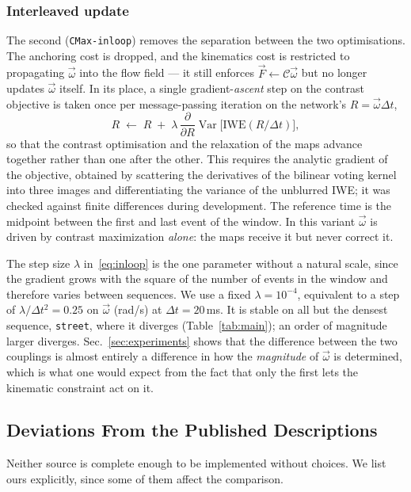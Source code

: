 \documentclass[journal]{IEEEtran}
\newcommand{\Fmap}{\vec{F}}
\newcommand{\Cmat}{\mathcal{C}}
\newcommand{\wvec}{\vec{\omega}}
\begin{document}
\subsubsection{Interleaved update}
The second (\texttt{CMax-inloop}) removes the separation between the two
optimisations. The anchoring cost is dropped, and the kinematics cost is
restricted to propagating $\wvec$ into the flow field --- it still enforces
$\Fmap \leftarrow \Cmat\wvec$ but no longer updates $\wvec$ itself. In its place,
a single gradient-\emph{ascent} step on the contrast objective is taken once per
message-passing iteration on the network's $R = \wvec\Delta t$,
\begin{equation}
R \;\leftarrow\; R \;+\; \lambda\,
  \frac{\partial}{\partial R}\operatorname{Var}\!\big[\mathrm{IWE}(R/\Delta t)\big],
\label{eq:inloop}
\end{equation}
so that the contrast optimisation and the relaxation of the maps advance
together rather than one after the other. This requires the analytic gradient of
the objective, obtained by scattering the derivatives of the bilinear voting
kernel into three images and differentiating the variance of the unblurred IWE;
it was checked against finite differences during development. The reference
time is the midpoint between the first and last event of the window. In this
variant $\wvec$ is driven by contrast maximization \emph{alone}: the maps
receive it but never correct it.

The step size $\lambda$ in~\eqref{eq:inloop} is the one parameter without a
natural scale, since the gradient grows with the square of the number of events
in the window and therefore varies between sequences. We use a fixed
$\lambda = 10^{-4}$, equivalent to a step of $\lambda/\Delta t^2 = 0.25$ on
$\wvec$ (rad/s) at $\Delta t = 20$\,ms. It is stable on all but the densest
sequence, \texttt{street}, where it diverges (Table~\ref{tab:main}); an order of
magnitude larger diverges. Sec.~\ref{sec:experiments} shows that the difference
between the two couplings is almost entirely a difference in how the
\emph{magnitude} of $\wvec$ is determined, which is what one would expect from
the fact that only the first lets the kinematic constraint act on it.

\subsection{Deviations From the Published Descriptions}
\label{sec:deviations}

Neither source is complete enough to be implemented without choices. We list
ours explicitly, since some of them affect the comparison.
\end{document}
